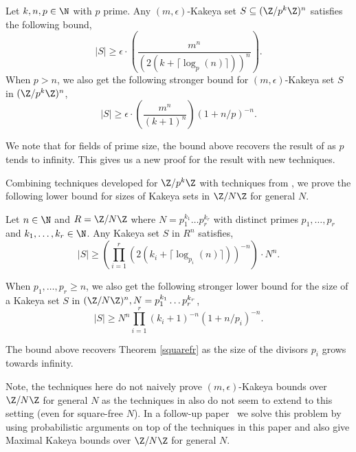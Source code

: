 \begin{thm}\label{thm:Smain}
Let $k,n,p\in \N$ with $p$ prime. Any $(m,\epsilon)$-Kakeya set $S\subseteq (\Z/p^k\Z)^n$ satisfies the following bound,
$$|S| \ge \epsilon\cdot\left(\frac{m^n}{(2(k+\lceil\log_p(n)\rceil))^n}\right).$$
When $p>n$, we also get the following stronger bound for $(m,\epsilon)$-Kakeya set $S$ in $(\Z/p^k\Z)^n$,
$$|S|\ge \epsilon\cdot\left(\frac{m^n}{(k+1)^n}\right) (1+n/p)^{-n}.$$
\end{thm}

We note that for fields of prime size, the bound above recovers the result of \cite{dvir2013extensions} as $p$ tends to infinity. This gives us a new proof for the result with new techniques. 

Combining techniques developed for $\Z/p^k\Z$ with techniques from \cite{dhar2021proof}, we prove the following lower bound for sizes of Kakeya sets in $\Z/N\Z$ for general $N$. 

\begin{thm}\label{main}
Let $n\in \N$ and $R=\Z/N\Z$  where $N=p_1^{k_1}\hdots p_r^{k_r}$ with distinct primes $p_1,\hdots,p_r$ and $k_1,\hdots,k_r\in \N$. Any Kakeya set $S$ in $R^n$ satisfies,
$$|S|\ge \left(\prod\limits_{i=1}^r (2(k_i+\lceil \log_{p_i}(n)\rceil))^{-n}\right)\cdot N^n.$$

When $p_1,\hdots,p_r\ge n$, we also get the following stronger lower bound for the size of a Kakeya set $S$ in $(\Z/N\Z)^n,N=p_1^{k_1}\hdots p_r^{k_r}$,
$$|S|\ge N^n\prod\limits_{i=1}^r(k_i+1)^{-n}(1+n/p_i)^{-n}.$$
\end{thm}

The bound above recovers Theorem \ref{squarefr} as the size of the divisors $p_i$ grows towards infinity.

Note, the techniques here do not naively prove $(m,\epsilon)$-Kakeya bounds over $\Z/N\Z$ for general $N$ as the techniques in \cite{dhar2021proof} also do not seem to extend to this setting (even for square-free $N$). In a follow-up paper~\cite{dhar2022maximal} we solve this problem by using probabilistic arguments on top of the techniques in this paper and also give Maximal Kakeya bounds over $\Z/N\Z$ for general $N$.

